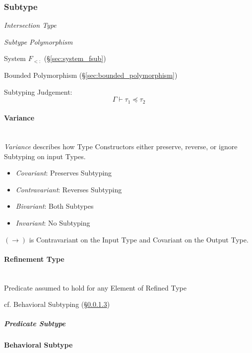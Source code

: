 \subsubsection{Subtype}\label{sec:subtype}

\emph{Intersection Type}

\emph{Subtype Polymorphism}

System $F_{<:}$ (\S\ref{sec:system_fsub})

Bounded Polymorphism (\S\ref{sec:bounded_polymorphism})

Subtyping Judgement:
\[
  \Gamma \vdash \tau_1 \preceq \tau_2
\]



\paragraph{Variance}\label{sec:variance}
\hfill \\

\emph{Variance} describes how Type Constructors either preserve,
reverse, or ignore Subtyping on input Types.

\begin{itemize}
  \item \emph{Covariant}: Preserves Subtyping
  \item \emph{Contravariant}: Reverses Subtyping
  \item \emph{Bivariant}: Both Subtypes
  \item \emph{Invariant}: No Subtyping
\end{itemize}

$(\rightarrow)$ is Contravariant on the Input Type and Covariant on
the Output Type.



\paragraph{Refinement Type}\label{sec:refinement_type}
\hfill \\

Predicate assumed to hold for any Element of Refined Type

cf. Behavioral Subtyping (\S\ref{sec:behavioral_subtype})


\subparagraph{Predicate Subtype}\label{sec:predicate_subtype}



\paragraph{Behavioral Subtype}\label{sec:behavioral_subtype}
\hfill \\

